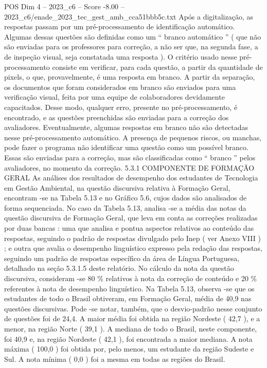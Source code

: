 \begin{textsample}{POS Dim 4 – 2023\_c6 – Score -8.00 – 2023\_c6/enade\_2023\_tec\_gest\_amb\_cca51bbb5c.txt}
Após a digitalização, as respostas passam por um pré-processamento de identificação automático.
Algumas dessas questões são definidas como um “ branco automático ” ( que não são enviadas para os professores para correção, a não ser que, na segunda fase, a de inspeção visual, seja constatada uma resposta ).
O critério usado nesse pré-processamento consiste em verificar, para cada questão, a partir da quantidade de pixels, o que, provavelmente, é uma resposta em branco.
A partir da separação, os documentos que foram considerados em branco são enviados para uma verificação visual, feita por uma equipe de colaboradores devidamente capacitados.
Desse modo, qualquer erro, presente no pré-processamento, é encontrado, e as questões preenchidas são enviadas para a correção dos avaliadores.
Eventualmente, algumas respostas em branco não são detectadas nesse pré-processamento automático.
A presença de pequenos riscos, ou manchas, pode fazer o programa não identificar uma questão como um possível branco.
Essas são enviadas para a correção, mas são classificadas como “ branco ” pelos avaliadores, no momento da correção. 5.3.1 COMPONENTE DE FORMAÇÃO GERAL As análises dos resultados de desempenho dos estudantes de Tecnologia em Gestão Ambiental, na questão discursiva relativa à Formação Geral, encontram -se na Tabela 5.13 e no Gráfico 5.6, cujos dados são analisados de forma sequenciada.
No caso da Tabela 5.13, analisa -se a média das notas da questão discursiva de Formação Geral, que leva em conta as correções realizadas por duas bancas : uma que analisa e pontua aspectos relativos ao conteúdo das respostas, seguindo o padrão de respostas divulgado pelo Inep ( ver Anexo VIII ) ; e outra que avalia o desempenho linguístico expresso pela redação das respostas, seguindo um padrão de respostas específico da área de Língua Portuguesa, detalhado na seção 5.3.1.5 deste relatório.
No cálculo da nota da questão discursiva, consideram -se 80 \% relativos à nota da correção de conteúdo e 20 \% referentes à nota de desempenho linguístico.
Na Tabela 5.13, observa -se que os estudantes de todo o Brasil obtiveram, em Formação Geral, média de 40,9 nas questões discursivas.
Pode -se notar, também, que o desvio-padrão nesse conjunto de questões foi de 24,4.
A maior média foi obtida na região Nordeste ( 42,7 ), e a menor, na região Norte ( 39,1 ).
A mediana de todo o Brasil, neste componente, foi 40,9 e, na região Nordeste ( 42,1 ), foi encontrada a maior mediana.
A nota máxima ( 100,0 ) foi obtida por, pelo menos, um estudante da região Sudeste e Sul.
A nota mínima ( 0,0 ) foi a mesma em todas as regiões do Brasil.

\end{textsample}
